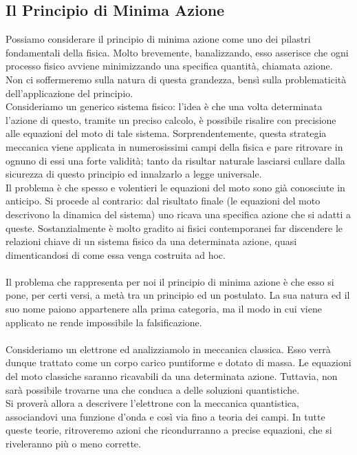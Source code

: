 \documentclass[]{article}
\begin{document}
	\subsection{Il Principio di Minima Azione}
	Possiamo considerare il principio di minima azione come uno dei pilastri fondamentali della fisica. Molto brevemente, banalizzando, esso asserisce che ogni processo fisico avviene minimizzando una specifica quantità, chiamata azione. Non ci soffermeremo sulla natura di questa grandezza, bensì sulla problematicità dell'applicazione del principio.\\
	Consideriamo un generico sistema fisico: l'idea è che una volta determinata l'azione di questo, tramite un preciso calcolo, è possibile risalire con precisione alle equazioni del moto di tale sistema. Sorprendentemente, questa strategia meccanica viene applicata in numerosissimi campi della fisica e pare ritrovare in ognuno di essi una forte validità; tanto da risultar naturale lasciarsi cullare dalla sicurezza di questo principio ed innalzarlo a legge universale.\\
	Il problema è che spesso e volentieri le equazioni del moto sono già conosciute in anticipo. Si procede al contrario: dal risultato finale (le equazioni del moto descrivono la dinamica del sistema) uno ricava una specifica azione che si adatti a queste. Sostanzialmente è molto gradito ai fisici contemporanei far discendere le relazioni chiave di un sistema fisico da una determinata azione, quasi dimenticandosi di come essa venga costruita ad hoc.\\
	\\
	Il problema che rappresenta per noi il principio di minima azione è che esso si pone, per certi versi, a metà tra un principio ed un postulato. La sua natura ed il suo nome paiono appartenere alla prima categoria, ma il modo in cui viene applicato ne rende impossibile la falsificazione.
	\\\\
	Consideriamo un elettrone ed analizziamolo in meccanica classica. Esso verrà dunque trattato come un corpo carico puntiforme e dotato di massa. 
	Le equazioni del moto classiche saranno ricavabili da una determinata azione. Tuttavia, non sarà possibile trovarne una che conduca a delle soluzioni quantistiche.\\
	Si proverà allora a descrivere l'elettrone con la meccanica quantistica, associandovi una funzione d'onda e così via fino a teoria dei campi. In tutte queste teorie, ritroveremo azioni che ricondurranno a precise equazioni, che si riveleranno più o meno corrette.\\
\end{document}
